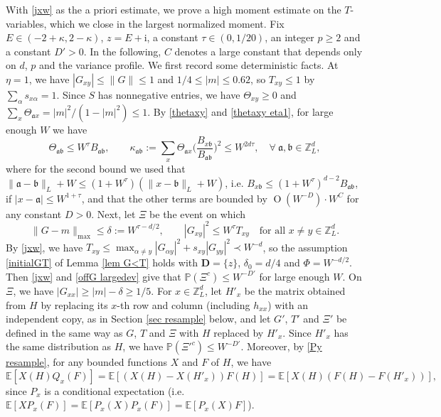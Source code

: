 \documentclass{article}
\newcommand{\1}{\mathds{1}}
\numberwithin{equation}{section}
\newcommand{\al}{\alpha}
\newcommand{\be}{\begin{equation}}
\newcommand{\ee}{\end{equation}}
\newcommand{\fa}{{\mathfrak a}}
\newcommand{\fb}{{\mathfrak b}}
\newcommand{\ii}{\mathrm{i}} %
\renewcommand{\leq}{\leqslant}
\renewcommand{\geq}{\geqslant}
\renewcommand{\le}{\leq}
\renewcommand{\ge}{\geq}
\renewcommand{\P}{\mathbb{P}}
\newcommand{\E}{\mathbb{E}}
\newcommand{\Z}{\mathbb{Z}}
\DeclareMathOperator{\OO}{O}
\theoremstyle{plain} %
\theoremstyle{remark}
\begin{document}
With \eqref{jxw} as the a priori estimate, we prove a high moment estimate on the $T$-variables, which we close in the largest normalized moment. Fix $E\in (-2+\kappa,2-\kappa)$, $z=E+\ii$, a constant $\tau\in(0,1/20)$, an integer $p\ge 2$ and a constant $D'>0$. In the following, $C$ denotes a large constant that depends only on $d$, $p$ and the variance profile. We first record some deterministic facts. At $\eta=1$, we have $|G_{xy}|\le \|G\|\le 1$ and $1/4\le |m|\le 0.62$, so $T_{xy}\le 1$ by $\sum_\al s_{x\al}=1$. Since $S$ has nonnegative entries, we have $\Theta_{xy}\ge 0$ and $\sum_x \Theta_{\fa x}=|m|^2/(1-|m|^2)\le 1$. By \eqref{thetaxy} and \eqref{thetaxy eta1}, for large enough $W$ we have 
$$\Theta_{\fa\fb}\le W^\tau B_{\fa\fb},\qquad \kappa_{\fa\fb}:=\sum_x \Theta_{\fa x}\Big(\frac{B_{x\fb}}{B_{\fa\fb}}\Big)^2\le W^{2d\tau},\quad \forall \ \fa,\fb\in\Z_L^d,$$
where for the second bound we used that $\|\fa-\fb\|_L+W\le (1+W^\tau)(\|x-\fb\|_L+W)$, i.e. $B_{x\fb}\le (1+W^\tau)^{d-2}B_{\fa\fb}$, if $|x-\fa|\le W^{1+\tau}$, and that the other terms are bounded by $\OO(W^{-D})\cdot W^{C}$ for any constant $D>0$. Next, let $\Xi$ be the event on which
\be\label{eta1 apriori}
\|G-m\|_{\max}\le \delta:=W^{\tau-d/2},\qquad |G_{xy}|^2\le W^\tau T_{xy}\quad \text{for all } x\ne y\in \Z_L^d.
\ee
By \eqref{jxw}, we have $T_{xy}\le \max_{\al\ne y}|G_{\al y}|^2+s_{xy}|G_{yy}|^2\prec W^{-d}$, so the assumption \eqref{initialGT} of Lemma \ref{lem G<T} holds with $\mathbf D=\{z\}$, $\delta_0=d/4$ and $\Phi=W^{-d/2}$. Then \eqref{jxw} and \eqref{offG largedev} give that $\P(\Xi^c)\le W^{-D'}$ for large enough $W$. On $\Xi$, we have $|G_{xx}|\ge |m|-\delta\ge 1/5$. For $x\in \Z_L^d$, let $H'_x$ be the matrix obtained from $H$ by replacing its $x$-th row and column (including $h_{xx}$) with an independent copy, as in Section \ref{sec resample} below, and let $G'$, $T'$ and $\Xi'$ be defined in the same way as $G$, $T$ and $\Xi$ with $H$ replaced by $H'_x$. Since $H'_x$ has the same distribution as $H$, we have $\P(\Xi'^c)\le W^{-D'}$. Moreover, by \eqref{Py resample}, for any bounded functions $X$ and $F$ of $H$, we have
$$\E\left[X(H) Q_x(F)\right]=\E\left[\left(X(H)-X(H'_x)\right)F(H)\right]=\E\left[X(H)\left(F(H)-F(H'_x)\right)\right],$$
since $P_x$ is a conditional expectation (i.e. $\E[X P_x(F)]=\E[P_x(X)P_x(F)]=\E[P_x(X)F]$).
\end{document}
